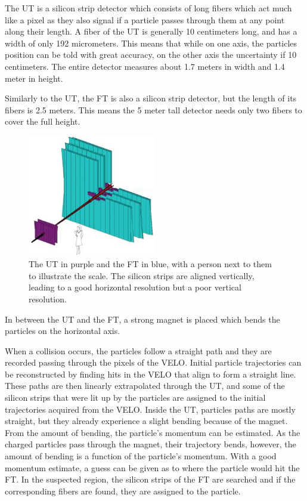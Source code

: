 \documentclass[12pt]{article}
\begin{document}
The UT is a silicon strip detector which consists of long fibers which act much like a pixel as they also signal if a particle passes through them at any point along their length. A fiber of the UT is generally 10 centimeters long, and has a width of only 192 micrometers. This means that while on one axis, the particles position can be told with great accuracy, on the other axis the uncertainty if 10 centimeters. The entire detector measures about 1.7 meters in width and 1.4 meter in height.

Similarly to the UT, the FT is also a silicon strip detector, but the length of its fibers is 2.5 meters. This means the 5 meter tall detector needs only two fibers to cover the full height.

\begin{figure}[H]
	\begin{center}
		\includegraphics[width=0.5\textwidth]{detector_ut_ft_drawing}
	\end{center}
	\caption{The UT in purple and the FT in blue, with a person next to them to illustrate the scale. The silicon strips are aligned vertically, leading to a good horizontal resolution but a poor vertical resolution.}
	\label{fig_detector_ut_ft_drawing}
\end{figure}

In between the UT and the FT, a strong magnet is placed which bends the particles on the horizontal axis.

When a collision occurs, the particles follow a straight path and they are recorded passing through the pixels of the VELO. Initial particle trajectories can be reconstructed by finding hits in the VELO that align to form a straight line. These paths are then linearly extrapolated through the UT, and some of the silicon strips that were lit up by the particles are assigned to the initial trajectories acquired from the VELO. Inside the UT, particles paths are mostly straight, but they already experience a slight bending because of the magnet. From the amount of bending, the particle's momentum can be estimated. As the charged particles pass through the magnet, their trajectory bends, however, the amount of bending is a function of the particle's momentum. With a good momentum estimate, a guess can be given as to where the particle would hit the FT. In the suspected region, the silicon strips of the FT are searched and if the corresponding fibers are found, they are assigned to the particle.
\end{document}
